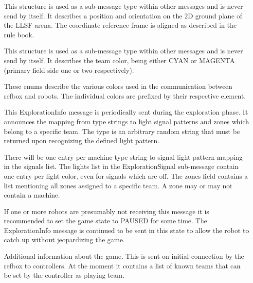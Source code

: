 \documentclass[a4paper]{article}
\begin{document}
%
{%
  This structure is used as a sub-message type within other messages
  and is never send by itself. It describes a position and orientation
  on the 2D ground plane of the LLSF arena. The coordinate reference
  frame is aligned as described in the rule book.
}

%
{%
  This structure is used as a sub-message type within other messages
  and is never send by itself. It describes the team color, being
  either CYAN or MAGENTA (primary field side one or two respectively).
}

%
{%
  These enums describe the various colors used in the communication
  between refbox and robots. The individual colors are prefixed by
  their respective element.
}

%
{%
  This ExplorationInfo message is periodically sent during the
  exploration phase. It announces the mapping from type strings to
  light signal patterns and zones which belong to a specific team. The
  type is an arbitrary random string that must be returned upon
  recognizing the defined light pattern.

  There will be one entry per machine type string to signal light
  pattern mapping in the signals list. The lights list in the
  ExplorationSignal sub-message contain one entry per light color,
  even for signals which are off. The zones field contains a list
  mentioning all zones assigned to a specific team. A zone may or may
  not contain a machine.

  \medskip
  If one or more robots are presumably not receiving this message it
  is recommended to set the game state to PAUSED for some time. The
  ExplorationInfo message is continued to be sent in this state to
  allow the robot to catch up without jeopardizing the game.
}

%
{%
  Additional information about the game. This is sent on initial
  connection by the refbox to controllers. At the moment it contains a
  list of known teams that can be set by the controller as playing
  team.
}
\end{document}
